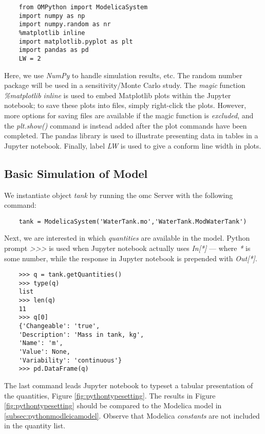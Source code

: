 \begin{lstlisting}
	from OMPython import ModelicaSystem
	import numpy as np
	import numpy.random as nr
	%matplotlib inline
	import matplotlib.pyplot as plt
	import pandas as pd
	LW = 2
\end{lstlisting}

Here, we use \textit{NumPy} to handle simulation results, etc. The random number package will be used in
a sensitivity/Monte Carlo study. The \textit{magic} function \textit{\%matplotlib inline} is used to embed Matplotlib
plots within the Jupyter notebook; to save these plots into files, simply right-click the plots. However, more options
for saving files are available if the magic function is \textit{excluded}, and the \textit{plt.show()} command is instead added
after the plot commands have been completed. The pandas library is used to illustrate presenting data in tables in a Jupyter
notebook. Finally, label \textit{LW} is used to give a conform line width in plots.

\subsection{Basic Simulation of Model}
\label{subsec:pythonsimulatemodel}

We instantiate object \textit{tank} by running the \acrshort{omc} Server with the following command:

\begin{lstlisting}
	tank = ModelicaSystem('WaterTank.mo','WaterTank.ModWaterTank')
\end{lstlisting}

Next, we are interested in which \textit{quantities} are available in the model. Python prompt \textit{>>>} is used when Jupyter
notebook actually uses \textit{In[*]} — where \textit{*} is some number, while the response in Jupyter notebook is prepended
with \textit{Out[*]}.

\begin{lstlisting}
	>>> q = tank.getQuantities()
	>>> type(q)
	list
	>>> len(q)
	11
	>>> q[0]
	{'Changeable': 'true', 
	'Description': 'Mass in tank, kg',
	'Name': 'm',
	'Value': None,
	'Variability': 'continuous'}
	>>> pd.DataFrame(q)
\end{lstlisting}

The last command leads Jupyter notebook to typeset a tabular presentation of the quantities, Figure \ref{fig:pythontypesetting}. The results
in Figure \ref{fig:pythontypesetting} should be compared to the Modelica model in \ref{subsec:pythonmodleicamodel}. Observe that Modelica \textit{constants} are not included in the quantity list.

